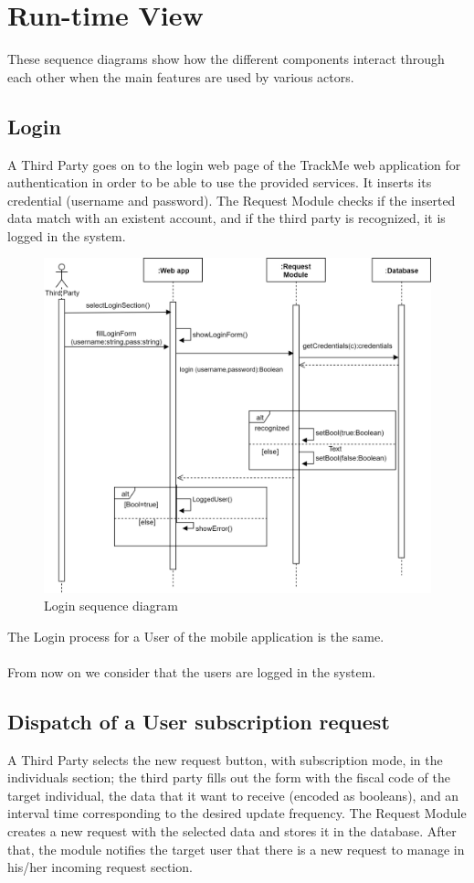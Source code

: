 \section{Run-time View}
These sequence diagrams show how the different components interact through each other when the main features are used by various actors.
\subsection{Login}
A Third Party goes on to the login web page of the TrackMe web application for authentication in order to be able to use the provided services. It inserts its credential (username and password). The Request Module checks if the inserted data match with an existent account, and if the third party is recognized, it is logged in the system.
\begin{figure}[H]
    \centering
    \includegraphics[scale=0.18]{DD/Pictures/login.png}
    \caption{Login sequence diagram}
\end{figure}
The Login process for a User of the mobile application is the same.\\ \\
From now on we consider that the users are logged in the system.
\subsection{Dispatch of a User subscription request}
A Third Party selects the new request button, with subscription mode, in the individuals section; the third party fills out the form with the fiscal code of the target individual, the data that it want to receive (encoded as booleans), and an interval time corresponding to the desired update frequency. The Request Module creates a new request with the selected data and stores it in the database. After that, the module notifies the target user that there is a new request to manage in his/her incoming request section.

